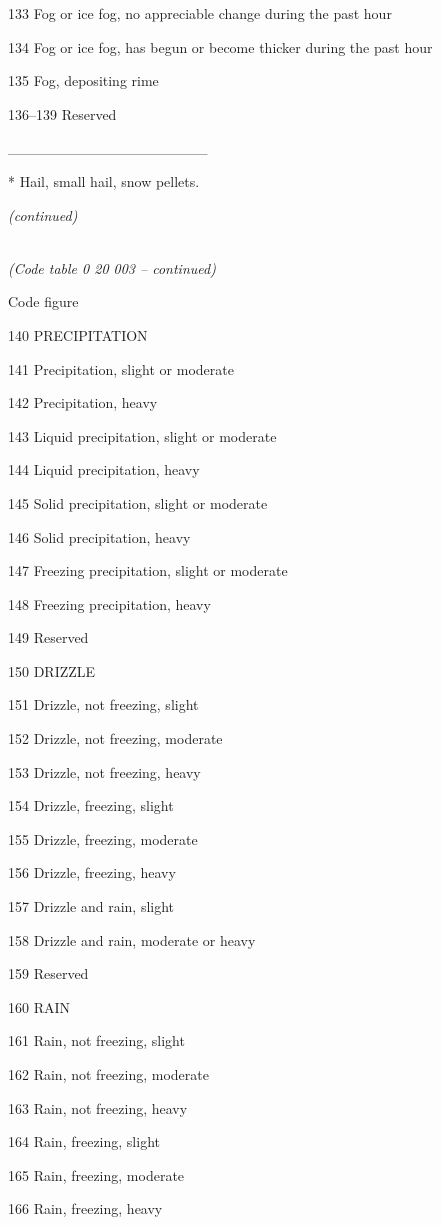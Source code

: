 133 Fog or ice fog, no appreciable change during the past hour

134 Fog or ice fog, has begun or become thicker during the past hour

135 Fog, depositing rime

136--139 Reserved

\_\_\_\_\_\_\_\_\_\_\_\_\_\_\_\_\_\_\_

* Hail, small hail, snow pellets.

\emph{(continued)}

\emph{\\
(Code table 0 20 003 -- continued)}

Code figure

140 PRECIPITATION

141 Precipitation, slight or moderate

142 Precipitation, heavy

143 Liquid precipitation, slight or moderate

144 Liquid precipitation, heavy

145 Solid precipitation, slight or moderate

146 Solid precipitation, heavy

147 Freezing precipitation, slight or moderate

148 Freezing precipitation, heavy

149 Reserved

150 DRIZZLE

151 Drizzle, not freezing, slight

152 Drizzle, not freezing, moderate

153 Drizzle, not freezing, heavy

154 Drizzle, freezing, slight

155 Drizzle, freezing, moderate

156 Drizzle, freezing, heavy

157 Drizzle and rain, slight

158 Drizzle and rain, moderate or heavy

159 Reserved

160 RAIN

161 Rain, not freezing, slight

162 Rain, not freezing, moderate

163 Rain, not freezing, heavy

164 Rain, freezing, slight

165 Rain, freezing, moderate

166 Rain, freezing, heavy

